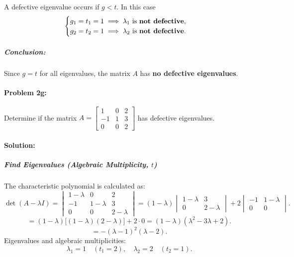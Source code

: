 \documentclass[12pt,letterpaper]{article}
\begin{document}
A defective eigenvalue occurs if \( g < t \). In this case
\[
\begin{cases}
g_1 = t_1 = 1 \implies \lambda_1 \text{ is \textbf{not defective}}, \\
g_2 = t_2 = 1 \implies \lambda_2 \text{ is \textbf{not defective}}.
\end{cases}
\]

\subparagraph{Conclusion:}
Since \( g = t \) for all eigenvalues, the matrix \( A \) has \textbf{no defective eigenvalues}.


\vspace{1.2cm}
\paragraph{Problem 2g:} Determine if the matrix \( A = \begin{bmatrix} 1 & 0 & 2 \\ -1 & 1 & 3 \\ 0 & 0 & 2 \end{bmatrix} \) has defective eigenvalues.

\paragraph{Solution:}

\subparagraph{Find Eigenvalues (Algebraic Multiplicity, \( t \))}
The characteristic polynomial is calculated as:
\[
\det(A - \lambda I) = \begin{vmatrix}
1 - \lambda & 0 & 2 \\
-1 & 1 - \lambda & 3 \\
0 & 0 & 2 - \lambda
\end{vmatrix} = (1 - \lambda) \begin{vmatrix}
1 - \lambda & 3 \\
0 & 2 - \lambda
\end{vmatrix} + 2 \begin{vmatrix}
-1 & 1 - \lambda \\
0 & 0
\end{vmatrix}.
\]
\[
= (1 - \lambda)\big[(1 - \lambda)(2 - \lambda)\big] + 2 \cdot 0 = (1 - \lambda)(\lambda^2 - 3\lambda + 2).
\]
\[
= -(\lambda - 1)^2(\lambda - 2).
\]
Eigenvalues and algebraic multiplicities:
\[
\lambda_1 = 1 \quad (t_1 = 2), \quad \lambda_2 = 2 \quad (t_2 = 1).
\]
\end{document}
